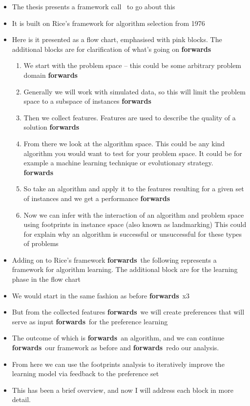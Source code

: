 \documentclass[20pt,a4paper]{extarticle}
\newcommand{\bi}{\begin{itemize}\item }
\newcommand{\ei}{\end{itemize}}
\newcommand{\be}{\begin{enumerate}\item }
\newcommand{\ee}{\end{enumerate}}
\newcommand{\forward}{{\color{red}\textbf{forwards}}~}
\newcommand{\printpage}[1]{%
    \clearpage
    \begin{figure}[t!]\centering
    \fbox{\texttt{[image: handout.pdf]}}
    \end{figure}
}
\begin{document}
\printpage{3}
\bi The thesis presents a framework call \Alice\ to go about this
    \item It is built on Rice's framework for algorithm selection from 1976
    \item Here is it presented as a flow chart, emphasised with pink blocks. 
    The additional blocks are for clarification of what's going on
    \forward \be We start with the problem space -- this could be some 
    arbitrary problem domain
    \forward \item Generally we will work with simulated data, so this will 
    limit 
    the problem space to a subspace of instances
    \forward \item Then we collect features. Features are used to describe the 
    quality of a solution
    \forward \item From there we look at the algorithm space. This could be any 
    kind algorithm you would want to test for your problem space. It could be 
    for example a machine learning technique or evolutionary strategy.
    \forward \item So take an algorithm and apply it to the features resulting 
    for a given set of instances and we get a performance
    \forward \item Now we can infer with the interaction of an algorithm and 
    problem space using footprints in instance space (also known as landmarking)
    This could for explain why an algorithm is successful or unsuccessful for 
    these types of problems
    \ee 
    \item Adding on to Rice's framework \forward the following represents a 
    framework for algorithm learning.
    The additional block are for the learning phase in the flow chart
    \item We would start in the same fashion as before \forward x3
    \item But from the collected features \forward we will create preferences  
    that will serve as input \forward for the preference learning
    \item The outcome of which is \forward an algorithm, and we can continue 
    \forward our framework as before and \forward redo our analysis.
    \item From here we can use the footprints analysis to iteratively improve  
    the learning model via feedback to the preference set
    \item This has been a brief overview, and now I will address each block in 
    more detail. 
\ei 
\end{document}

